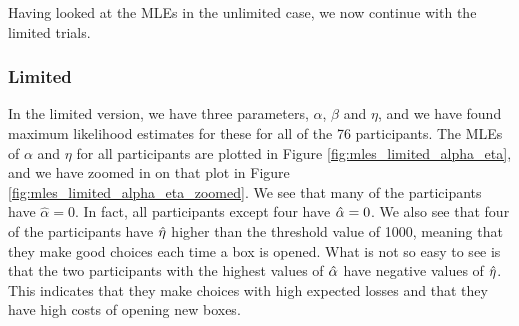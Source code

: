 Having looked at the MLEs in the unlimited case, we now continue with the limited trials. 


\subsubsection{Limited}
In the limited version, we have three parameters, $\alpha$, $\beta$ and $\eta$, and we have found maximum likelihood estimates for these for all of the 76 participants. The MLEs of $\alpha$ and $\eta$ for all participants are plotted in Figure \ref{fig:mles_limited_alpha_eta}, and we have zoomed in on that plot in Figure \ref{fig:mles_limited_alpha_eta_zoomed}. We see that many of the participants have $\hat{\alpha}=0$. In fact, all participants except four have $\hat{\alpha}=0$. We also see that four of the participants have $\hat{\eta}$ higher than the threshold value of 1000, meaning that they make good choices each time a box is opened. What is not so easy to see is that the two participants with the highest values of $\hat{\alpha}$ have negative values of $\hat{\eta}$. This indicates that they make choices with high expected losses and that they have high costs of opening new boxes. 
